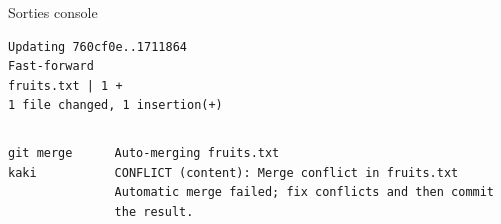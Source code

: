 \documentclass[table,tikz,12pt,svgnames]{beamer}
\begin{document}
\begin{frame}[fragile]
\begin{adjustwidth}{0.4cm}{-1cm}{}
\begin{columns}[T]
\begin{column}{.6\textwidth}
\color{darkgreen}%
Sorties console
\color{black}
\vspace{-1em}
\begin{verbatim}
Updating 760cf0e..1711864
Fast-forward
fruits.txt | 1 +
1 file changed, 1 insertion(+)
\end{verbatim}
\end{column}%
\end{columns}

\begin{columns}[T] %
	\hspace{0.3cm}
	\begin{column}{.3\textwidth}
		\color{darkgreen}%
		\color{black}
		\begin{verbatim}
git merge kaki
		\end{verbatim}
		
	\end{column}%
	\hspace{-0.4cm}
	\begin{column}{.9\textwidth}
		
	\color{darkgreen}%
	\color{black}
	\vspace{-0.2em}
	\begin{verbatim}
Auto-merging fruits.txt
CONFLICT (content): Merge conflict in fruits.txt
Automatic merge failed; fix conflicts and then commit the result.
		\end{verbatim}
	\end{column}%
\end{columns}
\end{adjustwidth}
\end{frame}

\end{document}
